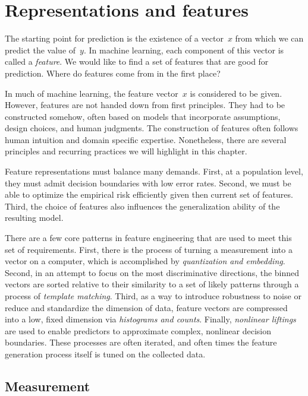 \documentclass{tufte-book}
\begin{document}
\chapter{Representations and features}

The starting point for prediction is the existence of a vector~\(x\)
from which we can predict the value of~\(y\). In machine learning, each
component of this vector is called a \emph{feature}. We would like to
find a set of features that are good for prediction. Where do features
come from in the first place?

In much of machine learning, the feature vector~\(x\) is considered to
be given. However, features are not handed down from first principles.
They had to be constructed somehow, often based on models that
incorporate assumptions, design choices, and human judgments. The
construction of features often follows human intuition and domain
specific expertise. Nonetheless, there are several principles and
recurring practices we will highlight in this chapter.

Feature representations must balance many demands. First, at a
population level, they must admit decision boundaries with low error
rates. Second, we must be able to optimize the empirical risk
efficiently given then current set of features. Third, the choice of
features also influences the generalization ability of the resulting
model.

There are a few core patterns in feature engineering that are used to
meet this set of requirements. First, there is the process of turning a
measurement into a vector on a computer, which is accomplished by
\emph{quantization and embedding}. Second, in an attempt to focus on the
most discriminative directions, the binned vectors are sorted relative
to their similarity to a set of likely patterns through a process of
\emph{template matching}. Third, as a way to introduce robustness to
noise or reduce and standardize the dimension of data, feature vectors
are compressed into a low, fixed dimension via \emph{histograms and
counts}. Finally, \emph{nonlinear liftings} are used to enable
predictors to approximate complex, nonlinear decision boundaries. These
processes are often iterated, and often times the feature generation
process itself is tuned on the collected data.

\hypertarget{measurement}{%
\section{Measurement}\label{measurement}}
\end{document}
